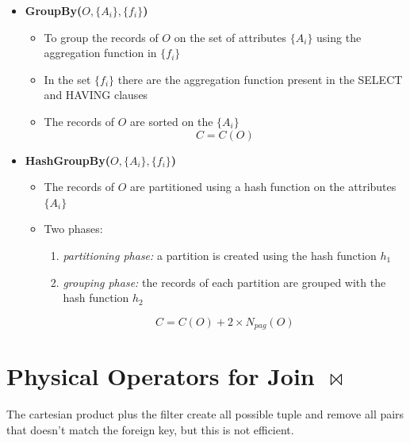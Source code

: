 \begin{itemize}
    \item \textbf{GroupBy($O,\{A_i\}, \{f_i\}$)}
    \begin{itemize}
        \item To group the records of $O$ on the set of attributes $\{A_i\}$ using the aggregation function in $\{f_i\}$
        \item In the set $\{f_i\}$ there are the aggregation function present in the SELECT and HAVING clauses
        \item The records of $O$ are sorted on the $\{A_i\}$
        $$C = C(O)$$
    \end{itemize}
    
    \item \textbf{HashGroupBy($O, \{A_i\}, \{f_i\}$)}
    \begin{itemize}
        \item The records of $O$ are partitioned using a hash function on the attributes $\{A_i\}$
        \item Two phases:
        \begin{enumerate}
            \item \textit{partitioning phase:} a partition is created using the hash function $h_1$
            \item \textit{grouping phase:} the records of each partition are grouped with the hash function $h_2$
        \end{enumerate}
        $$C = C(O) + 2 \times N_{pag}(O)$$
    \end{itemize}
\end{itemize}

\section{Physical Operators for Join $\bowtie$}
The cartesian product plus the filter create all possible tuple and remove all pairs that doesn't match the foreign key, but this is not efficient.

